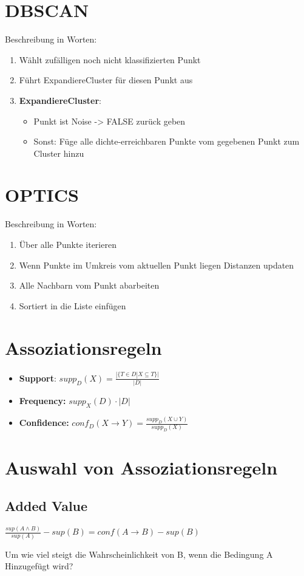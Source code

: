 \documentclass{article}
\begin{document}
\section{DBSCAN}
Beschreibung in Worten:
\begin{enumerate}
    \item Wählt zufälligen noch nicht klassifizierten Punkt
    \item Führt ExpandiereCluster für diesen Punkt aus
    \item \textbf{ExpandiereCluster}:
    \begin{itemize}
        \item Punkt ist Noise -> FALSE zurück geben
        \item Sonst: Füge alle dichte-erreichbaren Punkte vom gegebenen
        Punkt zum Cluster hinzu
    \end{itemize}
\end{enumerate}
\section{OPTICS}
Beschreibung in Worten: 
\begin{enumerate}
    \item Über alle Punkte iterieren
    \item Wenn Punkte im Umkreis vom aktuellen Punkt liegen Distanzen updaten
    \item Alle Nachbarn vom Punkt abarbeiten
    \item Sortiert in die Liste einfügen
\end{enumerate}
\section{Assoziationsregeln}
\begin{itemize}
    \item \textbf{Support}: $supp_D(X) = \frac{|\{ T \in D |X \subseteq T\}|}{|D|}$
    \item \textbf{Frequency:} $supp_X(D) \cdot |D|$
    \item \textbf{Confidence:} $conf_D(X \rightarrow Y) = \frac{supp_D(X \cup Y)}{supp_D(X)}$
\end{itemize}
\section{Auswahl von Assoziationsregeln}
\subsection{Added Value}
\begin{center}
    $
        \frac{sup (A \land B)}{sup (A)} - sup(B) = conf(A \rightarrow B) - sup(B)
    $
\end{center}
Um wie viel steigt die Wahrscheinlichkeit von B, wenn die Bedingung A
Hinzugefügt wird?
\end{document}
